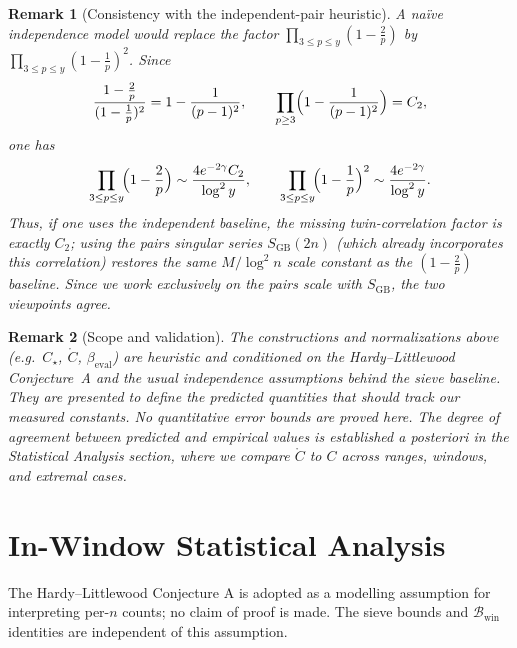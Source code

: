 \documentclass[11pt]{article}
\theoremstyle{inline}
\newtheorem*{remark}{Remark}
\theoremstyle{break}
\theoremstyle{break}
\theoremstyle{break}
\theoremstyle{break}
\theoremstyle{break}
\theoremstyle{inline}
\newcommand{\twin}{{\scriptscriptstyle\mathrm{win}}}
\newcommand{\Cmeas}{C}              %
\newcommand{\Cpred}{\mathring{C}}   %
\newcommand{\Bwin}{\mathcal{B}_\twin}
\newcommand{\betacal}{\beta_{\mathrm{eval}}}
\begin{document}
\begin{remark}[Consistency with the independent-pair heuristic]
A naïve independence model would replace the factor
\(\prod_{3\le p\le y}(1-\tfrac{2}{p})\) by \(\prod_{3\le p\le y}(1-\tfrac{1}{p})^2\).
Since
\begin{equation}
\frac{1-\tfrac{2}{p}}{(1-\tfrac{1}{p})^2}=1-\frac{1}{(p-1)^2},
\qquad
\prod_{p\ge3}\Bigl(1-\frac{1}{(p-1)^2}\Bigr)=C_2,
\end{equation}
one has \cite{HardyLittlewood1923, MontgomeryVaughan2007}
\begin{equation}
\prod_{3\le p\le y}\!\Bigl(1-\frac{2}{p}\Bigr)
\sim \frac{4e^{-2\gamma}C_2}{\log^2 y},
\qquad
\prod_{3\le p\le y}\!\Bigl(1-\frac{1}{p}\Bigr)^2
\sim \frac{4e^{-2\gamma}}{\log^2 y}.
\end{equation}
Thus, if one uses the independent baseline, the missing twin-correlation factor
is exactly \(C_2\); using the pairs singular series \(S_{\mathrm{GB}}(2n)\) (which
already incorporates this correlation) restores the same \(M/\log^2 n\) scale
constant as the \( (1-\tfrac{2}{p}) \) baseline. Since we work exclusively on the
pairs scale with \(S_{\mathrm{GB}}\), the two viewpoints agree.
\end{remark}

\begin{remark}[Scope and validation]
The constructions and normalizations above (e.g.\ \( C_\star \), \( \Cpred \), \( \betacal \))
are heuristic and conditioned on the Hardy–Littlewood Conjecture~A and the usual
independence assumptions behind the sieve baseline. They are presented to define
the \emph{predicted} quantities that should track our \emph{measured} constants.
No quantitative error bounds are proved here. The degree of agreement between
predicted and empirical values is established \emph{a posteriori} in the
Statistical Analysis section, where we compare \( \Cpred \) to \( \Cmeas \) across ranges,
windows, and extremal cases.
\end{remark}


\section*{In-Window Statistical Analysis}

The Hardy–Littlewood Conjecture A is adopted as a modelling assumption for interpreting per-\( n \) counts; no claim of proof is made. The sieve bounds and \( \Bwin \) identities are independent of this assumption.
\end{document}
